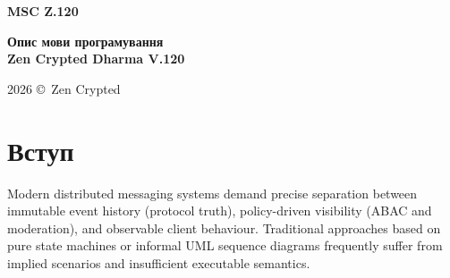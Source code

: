 \documentclass{article}
\newcommand\HUGE[1]{\fontsize{40}{40}\selectfont #1}
\begin{document}
\pagestyle{fancy}

\begin{titlepage}
  \AddToShipoutPictureBG*{\AtPageLowerLeft{\color{nato}\rule{\paperwidth}{\paperheight}}}
  \color{white}\thispagestyle{empty}\vspace*{4cm}\centering
  {\Huge  \textbf{MSC Z.120} \par} \vspace{2cm}
  {\HUGE  \textbf{Опис мови програмування \\
                     Zen Crypted Dharma V.120} \par} \vspace{2.5cm}
  \vfill
  {\large 2026 \copyright\ Zen Crypted \par}
\end{titlepage}

\newpage

\tableofcontents

\vspace{3cm}

\begin{abstract}
The Zen Crypted Dharma DSL V.120 is a scenario-based executable specification language developed for the
Zen Crypted Buddha V.420 messaging protocol within the synrc/chat ecosystem. This paper presents a complete
formal description of the language and demonstrates its natural mapping onto the standardised Message
Sequence Chart (MSC) notation defined in ITU-T Recommendation Z.120. By preserving the canonical/exact
duality of the DSL while grounding it in a typed semantic kernel, the language enables rigorous verification
of cross-layer invariants between protocol state, read/replay semantics, moderation, and attribute-based
access control (ABAC). The adaptation preserves all behavioural guarantees of the original DSL while
making it directly compatible with formal methods, TTCN-3 test generation, and high-level MSC (HMSC) composition.
The resulting specification satisfies the strict requirements of international telecommunication standards review.
\end{abstract}

\newpage

\section{Вступ}
Modern distributed messaging systems demand precise separation between immutable event history (protocol truth),
policy-driven visibility (ABAC and moderation), and observable client behaviour. Traditional approaches based
on pure state machines or informal UML sequence diagrams frequently suffer from implied scenarios and
insufficient executable semantics.
\end{document}
